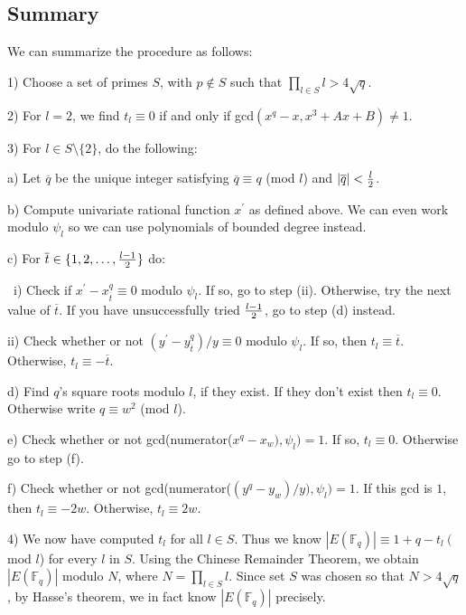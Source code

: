 \documentclass{article}
\newcommand{\f}{\mathbb{F}}
\begin{document}
\subsection{Summary}
We can summarize the procedure as follows:

1) Choose a set of primes $S$, with $p \not\in S$ such that $\prod_{l \in S} l > 4\sqrt{q}$.

2) For $l = 2$, we find $t_l \equiv 0$ if and only if gcd$(x^q-x, x^3+Ax+B) \not = 1.$

3) For $l \in S\setminus\{2\}$, do the following:

\hspace{2em} a) Let $\overline{q}$ be the unique integer satisfying $\overline{q} \equiv q$ (mod $l$) and $|\overline{q}|< {l \over 2}$.

\hspace{2em} b) Compute univariate rational function $x^\prime$ as defined above.  We can even work  modulo $\psi_l$ so we can use polynomials of 
bounded degree instead.

\hspace{2em} c) For $\overline{t} \in \{1,2,\dots, {l-1\over 2}\}$ do:

\hspace{4em}   ~i) Check if $x^\prime - x_{\overline{t}}^q \equiv 0$ modulo $\psi_l$.  If so, go to step (ii).  Otherwise, try the next value of 
$\overline{t}$.  If you have unsuccessfully tried ${l-1\over 2}$, go to step (d) instead. 

\hspace{4em}  ii) Check whether or not $(y^\prime-y_{\overline{t}}^q)/y \equiv 0$ modulo $\psi_l$.  If so, then $t_l \equiv \overline{t}$.  Otherwise, 
$t_l \equiv -\overline{t}$. 

\hspace{2em} d) Find $q$'s square roots modulo $l$, if they exist.  If they don't exist then $t_l \equiv 0$.  Otherwise write $q \equiv w^2$ (mod $l$).  

\hspace{2em} e) Check whether or not gcd(numerator($x^q-x_w),\psi_l)=1$.  If so, $t_l \equiv 0$.  Otherwise go to step (f).

\hspace{2em} f) Check whether or not gcd(numerator($(y^q-y_w)/y),\psi_l)=1$.  If this gcd is $1$, then $t_l \equiv -2w$.  Otherwise, $t_l \equiv 2w$.

4) We now have computed $t_l$ for all $l \in S$.  Thus we know $|E(\f_q)| \equiv 1 + q - t_l ~($mod $l$) for every $l$ in $S$.  
Using the Chinese Remainder 
Theorem, we obtain $|E(\f_q)|$ modulo $N$, where $N = \prod_{l\in S} l$.  
Since set $S$ was chosen so that $N > 4\sqrt{q}$, by Hasse's theorem, we in fact know 
$|E(\f_q)|$ precisely.
\vspace{1em}
\end{document}

